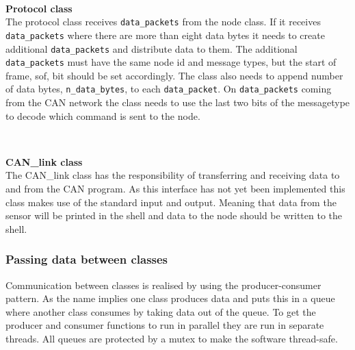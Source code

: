 ~\\ \par \textbf{Protocol class} ~ \\
The protocol class receives \texttt{data\_packets} from the node class. 
If it receives \texttt{data\_packets} where there are more than eight data bytes it needs to create additional \texttt{data\_packets} and distribute data to them. 
The additional \texttt{data\_packets} must have the same node id and message types, but the start of frame, sof, bit should be set accordingly.
The class also needs to append number of data bytes, \texttt{n\_data\_bytes}, to each \texttt{data\_packet}.
On \texttt{data\_packets} coming from the CAN network the class needs to use the last two bits of the messagetype to decode which command is sent to the node.

~\\ \par \textbf{CAN\_link class} ~ \\
The CAN\_link class has the responsibility of transferring and receiving data to and from the CAN program.
As this interface has not yet been implemented this class makes use of the standard input and output. 
Meaning that data from the sensor will be printed in the shell and data to the node should be written to the shell. 

\subsubsection*{Passing data between classes}
Communication between classes is realised by using the producer-consumer pattern.
As the name implies one class produces data and puts this in a queue where another class consumes by taking data out of the queue.
To get the producer and consumer functions to run in parallel they are run in separate threads.
All queues are protected by a mutex to make the software thread-safe.


